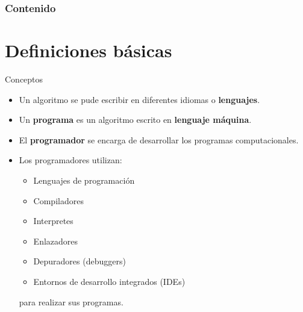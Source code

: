 \begin{frame}
    \frametitle{Contenido}
    \tableofcontents
\end{frame}

\section{Definiciones básicas}

\begin{frame}[c]{Conceptos}
  \begin{itemize}
    \item Un algoritmo se pude escribir en diferentes idiomas o
      \textbf{lenguajes}.
    \pausa
    \item Un \textbf{programa} es un algoritmo escrito en \textbf{lenguaje
      máquina}.
    \pausa
    \item El \textbf{programador} se encarga de desarrollar los programas
      computacionales.
    \pausa
    \item Los programadores utilizan:
      \begin{itemize}
        \item Lenguajes de programación
        \pausa
        \item Compiladores
        \pausa
        \item Interpretes
        \pausa
        \item Enlazadores
        \pausa
        \item Depuradores (debuggers)
        \pausa
        \item Entornos de desarrollo integrados (IDEs)
      \end{itemize}
      para realizar sus programas.
  \end{itemize}
\end{frame}

